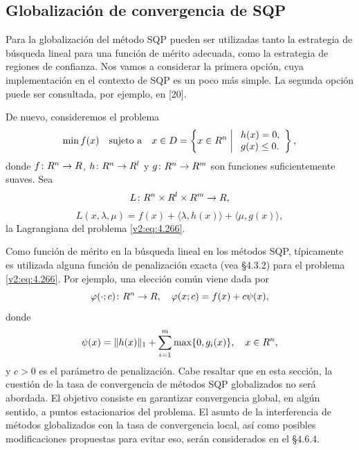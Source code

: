 
\subsection{Globalización de convergencia de SQP}\label{v2:sec:4.6.3}

Para la globalización del método SQP pueden ser utilizadas tanto la estrategia de búsqueda lineal para una función de mérito adecuada, como la estrategia de regiones de confianza. Nos vamos a considerar la primera opción, cuya implementación en el contexto de SQP es un poco más simple. La segunda opción puede ser consultada, por ejemplo, en [20].

De nuevo, consideremos el problema
\begin{equation}
    \min f(x) \quad \text{sujeto a} \quad x \in D = \left\{ x \in R^n \;\middle|\; \begin{array}{l} h(x) = 0, \\ g(x) \le 0. \end{array} \right\},
    \label{v2:eq:4.266}
\end{equation}
donde $f \colon R^n \to R$, $h \colon R^n \to R^l$ y $g \colon R^n \to R^m$ son funciones suficientemente suaves. Sea
\[
    L \colon R^n \times R^l \times R^m \to R,
\]
\[
    L(x, \lambda, \mu) = f(x) + \langle \lambda, h(x) \rangle + \langle \mu, g(x) \rangle,
\]
la Lagrangiana del problema \eqref{v2:eq:4.266}.

Como función de mérito en la búsqueda lineal en los métodos SQP, típicamente es utilizada alguna función de penalización exacta (vea \S 4.3.2) para el problema \eqref{v2:eq:4.266}. Por ejemplo, una elección común viene dada por
\begin{equation}
    \varphi(\cdot; c) \colon R^n \to R, \quad \varphi(x; c) = f(x) + c\psi(x),
    \label{v2:eq:4.267}
\end{equation}
donde
\begin{equation}
    \psi(x) = \|h(x)\|_1 + \sum_{i=1}^m \max\{0, g_i(x)\}, \quad x \in R^n,
    \label{v2:eq:4.268}
\end{equation}
y $c > 0$ es el parámetro de penalización.
Cabe resaltar que en esta sección, la cuestión de la tasa de convergencia de métodos SQP globalizados no será abordada. El objetivo consiste en garantizar convergencia global, en algún sentido, a puntos estacionarios del problema. El asunto de la interferencia de métodos globalizados con la tasa de convergencia local, así como posibles modificaciones propuestas para evitar eso, serán considerados en el \S 4.6.4.

